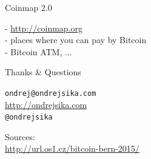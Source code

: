 \documentclass{beamer}
\begin{document}
\begin{frame}

    {\LARGE Coinmap 2.0}\\

    \vspace{5mm}

    - \url{http://coinmap.org}\\
    - places where you can pay by Bitcoin\\
    - Bitcoin ATM, ...\\


\end{frame}

\begin{frame}

    {\LARGE Thanks \& Questions}\\

    \vspace{1cm}

    \texttt{ondrej@ondrejsika.com}\\
    \url{http://ondrejsika.com}\\
    \texttt{@ondrejsika}\\

    \vspace{1cm}

    Sources:\\
    \url{http://url.os1.cz/bitcoin-bern-2015/}
\end{frame}
\end{document}
